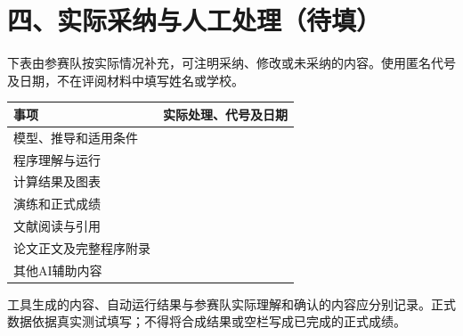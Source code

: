\documentclass[UTF8,a4paper,12pt,fontset=fandol]{ctexart}
\newcommand{\blank}{\underline{\hspace{3cm}}}
\begin{document}
\clearpage
\section*{四、实际采纳与人工处理（待填）}
下表由参赛队按实际情况补充，可注明采纳、修改或未采纳的内容。使用匿名代号及日期，不在评阅材料中填写姓名或学校。

\par\noindent\begin{tabularx}{\linewidth}{p{.35\linewidth}Y}\toprule
事项 & 实际处理、代号及日期\\\midrule
模型、推导和适用条件 & \blank\\[16pt]
程序理解与运行 & \blank\\[16pt]
计算结果及图表 & \blank\\[16pt]
演练和正式成绩 & \blank\\[16pt]
文献阅读与引用 & \blank\\[16pt]
论文正文及完整程序附录 & \blank\\[16pt]
其他AI辅助内容 & \blank\\[16pt]\bottomrule
\end{tabularx}

\noindent 工具生成的内容、自动运行结果与参赛队实际理解和确认的内容应分别记录。正式数据依据真实测试填写；不得将合成结果或空栏写成已完成的正式成绩。
\end{document}
